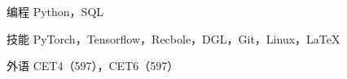 

\begin{cvskills}

  \cvskill
    {编程} %
    {Python，SQL} %

  \cvskill
    {技能} %
    {PyTorch，Tensorflow，Recbole，DGL，Git，Linux，\LaTeX} %



  \cvskill
    {外语} %
    {CET4（597），CET6（597）} %

\end{cvskills}
